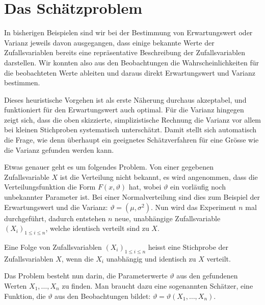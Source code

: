 \section{Das Schätzproblem} \label{section-schaetzproblem}
In bisherigen Beispielen sind wir bei der Bestimmung von Erwartungswert
oder Varianz jeweils davon ausgegangen, dass einige bekannte Werte der
Zufallsvariablen bereits eine repräsentative Beschreibung der Zufallsvariablen
darstellen.
Wir konnten also aus den Beobachtungen die Wahrscheinlichkeiten
für die beobachteten Werte ableiten und daraus direkt Erwartungswert
und Varianz bestimmen.

Dieses heuristische Vorgehen ist als erste Näherung durchaus akzeptabel,
und funktioniert für den Erwartungswert auch optimal.
Für die Varianz
hingegen zeigt sich, dass die oben skizzierte, simplizistische Rechnung
die Varianz vor allem bei kleinen Stichproben systematisch unterschätzt.
Damit stellt sich automatisch die Frage, wie denn überhaupt ein geeignetes
Schätzverfahren für eine Grösse wie die Varianz gefunden werden kann.

Etwas genauer geht es um folgendes Problem.
Von einer gegebenen Zufallsvariable
$X$ ist die Verteilung nicht bekannt, es wird angenommen, dass die
Verteilungsfunktion die Form $F(x,\vartheta)$ hat, wobei
$\vartheta$ ein vorläufig noch unbekannter Parameter ist.
Bei einer Normalverteilung sind dies zum Beispiel der Erwartungswert und
die Varianz: $\vartheta=(\mu,\sigma^2)$.
Nun wird das
Experiment $n$ mal durchgeführt, dadurch entstehen $n$ neue, unabhängige
Zufallsvariable $(X_i)_{1\le i\le n}$, welche identisch verteilt sind zu
$X$.

\begin{definition}
Eine Folge von Zufallsvariablen $(X_i)_{1\le i\le n}$ heisst eine
Stichprobe der Zufallsvariablen $X$, wenn die $X_i$ unabhängig 
und identisch zu $X$ verteilt.
\end{definition}
Das Problem besteht nun darin, die Parameterwerte $\vartheta$
aus den gefundenen Werten $X_1,\dots,X_n$ zu finden.
Man braucht dazu
eine sogenannten Schätzer, eine Funktion, die $\vartheta$ aus den
Beobachtungen bildet: $\vartheta=\vartheta(X_1,\dots,X_n)$.

